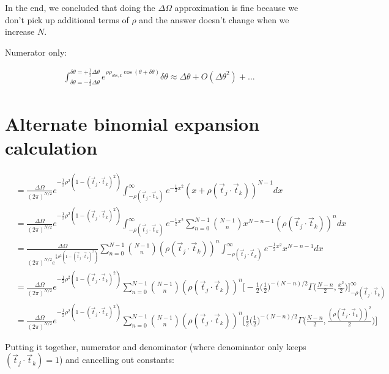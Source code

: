 \documentclass[12pt]{article}
\newcommand{\ptjtk}{\rho(\vec{t}_j\cdot\vec{t}_k)}
\newcommand{\tjtk}{(\vec{t}_j\cdot\vec{t}_k)}
\begin{document}
In the end, we concluded that doing the $\Delta\Omega$ approximation is fine because we don't pick up additional terms of $\rho$ and the answer doesn't change when we increase $N$.

Numerator only:

        \begin{align}
        \int_{\delta\theta=-\frac{1}{2}\Delta\theta}^{\delta\theta=+\frac{1}{2}\Delta\theta} e^{\rho\rho_{obs,k}\cos(\theta+\delta\theta)}\delta\theta \approx \Delta\theta + O(\Delta\theta^2)+...
        \end{align}

\section{Alternate binomial expansion calculation}\label{section:alternate_binomial_expansion_calculations}

        \begin{align}
        &= \frac{\Delta\Omega}{(2\pi)^{N/2}} e^{-\frac{1}{2}\rho^2(1-(\vec{t}_j\cdot\vec{t}_k)^2)} \int_{-\ptjtk}^\infty  e^{-\frac{1}{2} x^2  } {(x+\ptjtk)^{N-1}} dx \\
        &= \frac{\Delta\Omega}{(2\pi)^{N/2}} e^{-\frac{1}{2}\rho^2(1-(\vec{t}_j\cdot\vec{t}_k)^2)} \int_{-\ptjtk}^\infty  e^{-\frac{1}{2} x^2  } {\sum_{n=0}^{N-1} \binom{N-1}{n}x^{N-n-1}(\ptjtk)^{n} } dx \\
        &= \frac{\Delta\Omega}{(2\pi)^{N/2}  e^{\frac{1}{2}\rho^2(1-(\vec{t}_j\cdot\vec{t}_k)^2)}}  \sum_{n=0}^{N-1} \binom{N-1}{n} (\ptjtk)^{n} \int_{-\ptjtk}^\infty e^{-\frac{1}{2} x^2  } x^{N-n-1}  dx \\
        &= \frac{\Delta\Omega}{(2\pi)^{N/2}} e^{-\frac{1}{2}\rho^2(1-(\vec{t}_j\cdot\vec{t}_k)^2)}  \sum_{n=0}^{N-1} \binom{N-1}{n} (\ptjtk)^{n} 
          \Big[
            -\frac{1}{2}\Big(\frac{1}{2}\Big)^{-(N-n)/2}\Gamma\Big(\frac{N-n}{2},\frac{x^2}{2}\Big)
          \Big]^{\infty}_{-\ptjtk} \\
        &= \frac{\Delta\Omega}{(2\pi)^{N/2}} e^{-\frac{1}{2}\rho^2(1-(\vec{t}_j\cdot\vec{t}_k)^2)}  \sum_{n=0}^{N-1} \binom{N-1}{n} (\ptjtk)^{n} 
          \Big[
            \frac{1}{2}\Big(\frac{1}{2}\Big)^{-(N-n)/2}\Gamma\Big(\frac{N-n}{2},\frac{(\ptjtk)^2}{2}\Big)
          \Big]
        \end{align}

Putting it together, numerator and denominator (where denominator only keeps $\tjtk=1$) and cancelling out constants:
\end{document}
